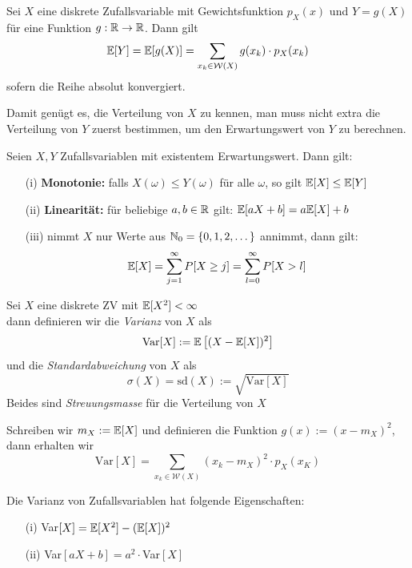 \begin{satz}
Sei $X$ eine diskrete Zufallsvariable mit Gewichtsfunktion $p_X(x)$ und $Y = g(X)$ für eine Funktion $g:\mathbb{R} \to \mathbb{R}$. Dann gilt
$$ \mathbb{E}[Y] = \mathbb{E}[g(X)] = \sum_{x_k \in \mathcal{W}(X)} g(x_k) \cdot p_X(x_k)$$
sofern die Reihe absolut konvergiert.
\end{satz}
Damit genügt es, die Verteilung von $X$ zu kennen, man muss nicht extra die Verteilung von $Y$ zuerst bestimmen, um den Erwartungswert von $Y$ zu berechnen.

\begin{satz}
Seien $X,Y$ Zufallsvariablen mit existentem Erwartungswert. Dann gilt:
\begin{itemize}
\item[(i)] \textbf{Monotonie:} falls $X(\omega) \leq Y(\omega) $ für alle $\omega$, so gilt $ \mathbb{E}[X] \leq \mathbb{E}[Y]$
\item[(ii)] \textbf{Linearität:} für beliebige $a,b \in \mathbb{R}$ gilt: $\mathbb{E}[aX+b] = a\mathbb{E}[X] + b$
\item[(iii)] nimmt $X$ nur Werte aus $\mathbb{N}_0 = \{0,1,2,\dots\}$ annimmt, dann gilt:
$$ \mathbb{E}[X] = \sum_{j=1}^\infty P[X \geq j] = \sum_{l = 0}^\infty P[X > l]$$
\end{itemize}
\end{satz}

\begin{definition}
Sei $X$ eine diskrete ZV mit $\mathbb{E}[X^2] < \infty$\\ dann definieren wir die \textit{Varianz} von $X$ als
$$ \mbox{Var}[X] := \mathbb{E}\left[(X - \mathbb{E}[X])^2\right]$$ und die \textit{Standardabweichung} von $X$ als
$$ \sigma(X) = \mbox{sd}(X) := \sqrt{\mbox{Var}[X]}$$
Beides sind \textit{Streuungsmasse} für die Verteilung von $X$
\end{definition}

Schreiben wir $m_X := \mathbb{E}[X]$ und definieren die Funktion $g(x):= (x-m_X)^2$, dann erhalten wir
$$ \mbox{Var}[X] = \sum_{x_k \in \mathcal{W}(X)} (x_k - m_X)^2 \cdot p_X(x_K)$$

\begin{lemma}
Die Varianz von Zufallsvariablen hat folgende Eigenschaften:
\begin{itemize}
\item[(i)] Var$[X] = \mathbb{E}[X^2] - (\mathbb{E}[X])^2$
\item[(ii)] Var$[aX + b] = a^2 \cdot $Var$[X]$
\end{itemize}
\end{lemma}



